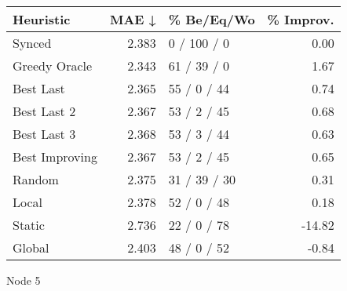 \begin{tabular}{lrlr}
\toprule
\textbf{Heuristic} & \textbf{MAE ↓} & \textbf{\% Be/Eq/Wo} & \textbf{\% Improv.} \\
\midrule
            Synced &          2.383 &          0 / 100 / 0 &                0.00 \\
     Greedy Oracle &          2.343 &          61 / 39 / 0 &                1.67 \\
         Best Last &          2.365 &          55 / 0 / 44 &                0.74 \\
       Best Last 2 &          2.367 &          53 / 2 / 45 &                0.68 \\
       Best Last 3 &          2.368 &          53 / 3 / 44 &                0.63 \\
    Best Improving &          2.367 &          53 / 2 / 45 &                0.65 \\
            Random &          2.375 &         31 / 39 / 30 &                0.31 \\
             Local &          2.378 &          52 / 0 / 48 &                0.18 \\
            Static &          2.736 &          22 / 0 / 78 &              -14.82 \\
            Global &          2.403 &          48 / 0 / 52 &               -0.84 \\
\bottomrule
\end{tabular}
\caption{Node 5}
\label{tab:ds_iid_lr01_le2_bs2_5}
